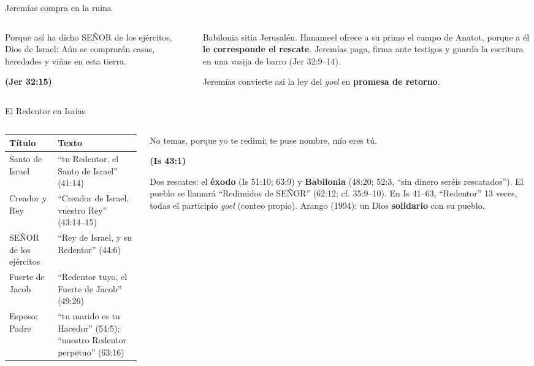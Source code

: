 \documentclass[hyperref={bookmarks=false},aspectratio=169]{beamer}
\newcommand{\SENOR}{S{\fontsize{0.78em}{1em}\selectfont EÑOR}}
\newcommand{\fuente}[1]{\par\hfill{\upshape\bfseries\footnotesize\textcolor{tierraroja}{#1}}}
\newcommand{\destacar}[1]{\textbf{\textcolor{tierraroja}{#1}}}
\begin{document}
\begin{frame}{Jeremías compra en la ruina}
\begin{columns}[c,onlytextwidth]
\begin{column}{0.52\textwidth}
\begin{cita}Porque así ha dicho \SENOR{} de los ejércitos, Dios de Israel: Aún se comprarán casas, heredades y viñas en esta tierra.\fuente{(Jer 32:15)}\end{cita}
\end{column}
\begin{column}{0.45\textwidth}\small\RaggedRight
Babilonia sitia Jerusalén. Hanameel ofrece a su primo el campo de Anatot, porque a él \destacar{le corresponde el rescate}. Jeremías paga, firma ante testigos y guarda la escritura en una vasija de barro (Jer 32:9--14).\par\medskip
Jeremías convierte así la ley del \emph{goel} en \destacar{promesa de retorno}.
\end{column}
\end{columns}
\end{frame}

\begin{frame}{El Redentor en Isaías}
\begin{columns}[t,onlytextwidth]
\begin{column}{0.53\textwidth}\scriptsize\renewcommand{\arraystretch}{1.12}
\begin{tabular}{@{}L{2.1cm}L{4.1cm}@{}}
\toprule
\textbf{Título} & \textbf{Texto} \\ \midrule
Santo de Israel & ``tu Redentor, el Santo de Israel'' (41:14) \\
Creador y Rey & ``Creador de Israel, vuestro Rey'' (43:14--15) \\
\SENOR{} de los ejércitos & ``Rey de Israel, y su Redentor'' (44:6) \\
Fuerte de Jacob & ``Redentor tuyo, el Fuerte de Jacob'' (49:26) \\
Esposo; Padre & ``tu marido es tu Hacedor'' (54:5); ``nuestro Redentor perpetuo'' (63:16) \\
\bottomrule
\end{tabular}
\end{column}
\begin{column}{0.45\textwidth}
\begin{cita}No temas, porque yo te redimí; te puse nombre, mío eres tú.\fuente{(Is 43:1)}\end{cita}
\scriptsize\RaggedRight Dos rescates: el \destacar{éxodo} (Is 51:10; 63:9) y \destacar{Babilonia} (48:20; 52:3, ``sin dinero seréis rescatados''). El pueblo se llamará ``Redimidos de \SENOR'' (62:12; cf. 35:9--10). En Is 41--63, ``Redentor'' 13 veces, todas el participio \emph{goel} (conteo propio). Arango (1994): un Dios \destacar{solidario} con su pueblo.
\end{column}
\end{columns}
\end{frame}
\end{document}
